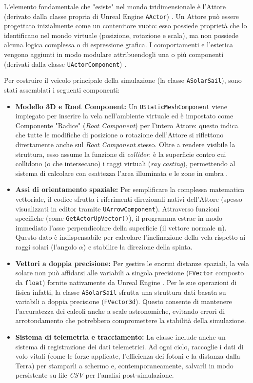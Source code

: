 L'elemento fondamentale che "esiste" nel mondo tridimensionale è l'Attore (derivato dalla classe propria di Unreal Engine \lstinline|AActor|) \cite{epicgames_unrealengine}. Un Attore può essere progettato inizialmente come un contenitore vuoto: esso possiede proprietà che lo identificano nel mondo virtuale (posizione, rotazione e scala), ma non possiede alcuna logica complessa o di espressione grafica. I comportamenti e l'estetica vengono aggiunti in modo modulare attribuendogli una o più componenti (derivati dalla classe \lstinline|UActorComponent|) \cite{epicgames_unrealengine}.

Per costruire il veicolo principale della simulazione (la classe \lstinline|ASolarSail|), sono stati assemblati i seguenti componenti:

\begin{itemize}
    \item \textbf{Modello 3D e Root Component:} Un \lstinline|UStaticMeshComponent| viene impiegato per inserire la vela nell'ambiente virtuale ed è impostato come Componente "Radice" (\textit{Root Component}) per l'intero Attore: questo indica che tutte le modifiche di posizione o rotazione dell'Attore  si riflettono direttamente anche sul \textit{Root Component} stesso. Oltre a rendere visibile la struttura, esso assume la funzione di \textit{collider}: è la superficie contro cui collidono (o che intersecano) i raggi virtuali (\textit{ray casting}), permettendo al sistema di calcolare con esattezza l'area illuminata e le zone in ombra \cite{ericson2004real}.
    \item \textbf{Assi di orientamento spaziale:} Per semplificare la complessa matematica vettoriale, il codice sfrutta i riferimenti direzionali nativi dell'Attore (spesso visualizzati in editor tramite \lstinline|UArrowComponent|). Attraverso funzioni specifiche (come \lstinline|GetActorUpVector()|), il programma estrae in modo immediato l'asse perpendicolare della superficie (il vettore normale $\mathbf{n}$). Questo dato è indispensabile per calcolare l'inclinazione della vela rispetto ai raggi solari (l'angolo $\alpha$) e stabilire la direzione della spinta.
    \item \textbf{Vettori a doppia precisione:} Per gestire le enormi distanze spaziali, la vela solare non può affidarsi alle variabili a singola precisione (\lstinline|FVector| composto da \lstinline|float|) fornite nativamente da Unreal Engine \cite{epicgames_unrealengine}. Per le sue operazioni di fisica infatti, la classe \lstinline|ASolarSail| sfrutta una struttura dati basata su variabili a doppia precisione (\lstinline|FVector3d|). Questo consente di mantenere l'accuratezza dei calcoli anche a scale astronomiche, evitando errori di arrotondamento che potrebbero compromettere la stabilità della simulazione.
    \item \textbf{Sistema di telemetria e tracciamento:} La classe include anche un sistema di registrazione dei dati telemetrici. Ad ogni ciclo, raccoglie i dati di volo vitali (come le forze applicate, l'efficienza dei fotoni e la distanza dalla Terra) per stamparli a schermo e, contemporaneamente, salvarli in modo persistente su file \textit{CSV} per l'analisi post-simulazione.
\end{itemize}

